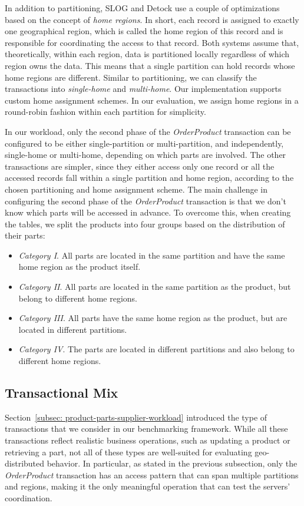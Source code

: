 In addition to partitioning, SLOG and Detock use a couple of optimizations based on the concept of \textit{home regions}. In short, each record is assigned to exactly one geographical region, which is called the home region of this record and is responsible for coordinating the access to that record. Both systems assume that, theoretically, within each region, data is partitioned locally regardless of which region owns the data. This means that a single partition can hold records whose home regions are different. Similar to partitioning, we can classify the transactions into \textit{single-home} and \textit{multi-home}. Our implementation supports custom home assignment schemes. In our evaluation, we assign home regions in a round-robin fashion within each partition for simplicity.

In our workload, only the second phase of the \textit{OrderProduct} transaction can be configured to be either single-partition or multi-partition, and independently, single-home or multi-home, depending on which parts are involved. The other transactions are simpler, since they either access only one record or all the accessed records fall within a single partition and home region, according to the chosen partitioning and home assignment scheme. The main challenge in configuring the second phase of the \textit{OrderProduct} transaction is that we don't know which parts will be accessed in advance. To overcome this, when creating the tables, we split the products into four groups based on the distribution of their parts:
\begin{itemize}
    \item \textit{Category I}. All parts are located in the same partition and have the same home region as the product itself.
    \item \textit{Category II}. All parts are located in the same partition as the product, but belong to different home regions.
    \item \textit{Category III}. All parts have the same home region as the product, but are located in different partitions.
    \item \textit{Category IV}. The parts are located in different partitions and also belong to different home regions.
\end{itemize}

\subsection{Transactional Mix}
\label{subsec: transactional-mix}
Section~\ref{subsec: product-parts-supplier-workload} introduced the type of transactions that we consider in our benchmarking framework. While all these transactions reflect realistic business operations, such as updating a product or retrieving a part, not all of these types are well-suited for evaluating geo-distributed behavior. In particular, as stated in the previous subsection, only the \textit{OrderProduct} transaction has an access pattern that can span multiple partitions and regions, making it the only meaningful operation that can test the servers' coordination.

